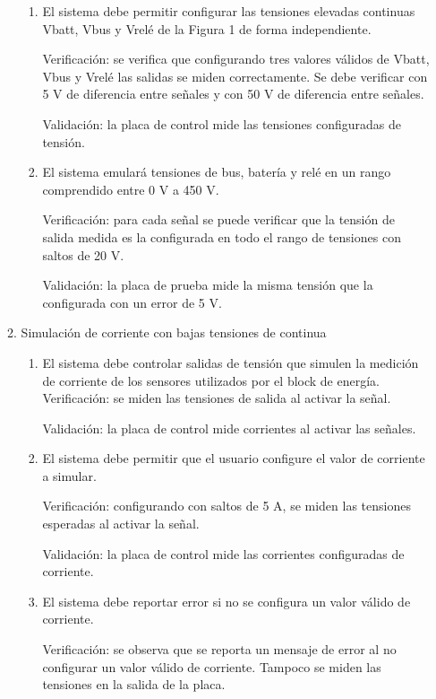 \documentclass[
11pt, %
codirector, %
]{charter}
\begin{document}
\begin{enumerate}
\begin{enumerate}
\begin{enumerate}
			            \item El sistema debe permitir configurar las tensiones elevadas continuas Vbatt, Vbus y Vrelé de la Figura 1 de forma independiente.

			                  Verificación: se verifica que configurando tres valores válidos de Vbatt, Vbus y Vrelé las salidas se miden correctamente. Se debe verificar con 5 V de diferencia entre señales y con 50 V de diferencia entre señales.

			                  Validación: la placa de control mide las tensiones configuradas de tensión.

			            \item El sistema emulará tensiones de bus, batería y relé en un rango comprendido entre 0 V a 450 V.

			                  Verificación: para cada señal se puede verificar que la tensión de salida medida es la configurada en todo el rango de tensiones con saltos de 20 V.

			                  Validación: la placa de prueba mide la misma tensión que la configurada con un error de 5 V.
		            \end{enumerate}
		      \item Simulación de corriente con bajas tensiones de continua
		            \begin{enumerate}
			            \item El sistema debe controlar salidas de tensión que simulen la medición de corriente de los sensores utilizados por el block de energía.
			                  Verificación: se miden las tensiones de salida al activar la señal.

			                  Validación: la placa de control mide corrientes al activar las señales.
			            \item El sistema debe permitir que el usuario configure el valor de corriente a simular.

			                  Verificación: configurando con saltos de 5 A, se miden las tensiones esperadas al activar la señal.

			                  Validación: la placa de control mide las corrientes configuradas de corriente.

			            \item El sistema debe reportar error si no se configura un valor válido de corriente.

			                  Verificación: se observa que se reporta un mensaje de error al no configurar un valor válido de corriente. Tampoco se miden las tensiones en la salida de la placa.


\end{enumerate}
\end{enumerate}
\end{enumerate}
\end{document}

